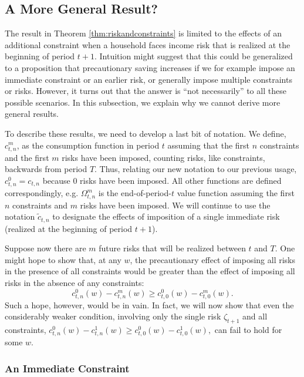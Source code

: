 \documentclass[titlepage]{\econtex}
\begin{document}
  \subsection{A More General Result?}
  The result in Theorem \ref{thm:riskandconstraints} is limited to the effects of an additional constraint when a household faces income risk that is realized at the beginning of period $t+1$. Intuition might suggest that this could be generalized to a proposition that  precautionary saving increases if we for example impose an immediate constraint or an earlier risk, or generally impose multiple constraints or risks. However, it turns out that the answer is ``not necessarily'' to all these possible scenarios. In this subsection, we explain why we cannot derive more general results.


  To describe these results, we need to develop a last bit of notation.  We define, $c_{t,n}^{m}$, as the consumption function in period $t$ assuming that the first $n$ constraints and the first $m$ risks have been imposed, counting risks, like constraints, backwards from period $T$.  Thus, relating our new notation to our previous usage, $c_{t,n}^{0}=c_{t,n}$ because 0 risks have been imposed. All other functions are defined correspondingly, e.g. $\Omega_{t,n}^{m}$ is the end-of-period-$t$ value function assuming the first $n$ constraints and $m$ risks have been imposed. We will continue to use the notation $\tilde{c}_{t,n}$ to designate the effects of imposition of a single immediate risk (realized at the beginning of period $t+1$).

  Suppose now there are $m$ future risks that will be realized between $t$ and $T$. One might hope to show that, at any $w$, the precautionary effect of imposing all risks in the presence of all constraints would be greater than the effect of imposing all risks in the absence of any
  constraints:
  \begin{equation}
    c_{t,n}^{0}(w) - c_{t,n}^{m}(w) \geq c_{t,0}^{0}(w) - c_{t,0}^{m}(w).\label{eq:nottrue}
  \end{equation}
  Such a hope, however, would be in vain.  In fact, we will now show that even the considerably weaker condition, involving only the single risk $\zeta_{t+1}$ and all constraints, $c_{t,n}^{0}(w) - c_{t,n}^{1}(w) \geq c_{t,0}^{0}(w) - c_{t,0}^{1}(w),$ can fail to hold for some $w$.


  \subsubsection{An Immediate Constraint}\label{subsubsec:ImmediateConstr}
\end{document}
